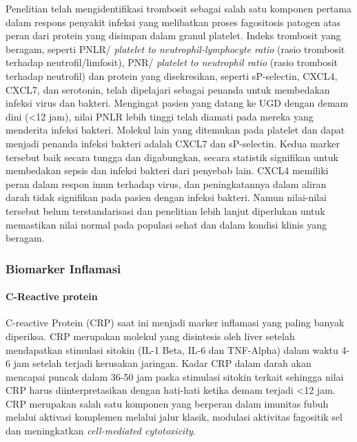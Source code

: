 \documentclass[
  10pt,
  letterpaper,
]{article}
\begin{document}
Penelitian telah mengidentifikasi trombosit sebagai salah satu komponen
pertama dalam respons penyakit infeksi yang melibatkan proses
fagositosis patogen atas peran dari protein yang disimpan dalam granul
platelet. Indeks trombosit yang beragam, seperti PNLR/ \emph{platelet to
neutrophil-lymphocyte ratio} (rasio trombosit terhadap
neutrofil/limfosit), PNR/ \emph{platelet to neutrophil ratio} (rasio
trombosit terhadap neutrofil) dan protein yang disekresikan, seperti
sP-selectin, CXCL4, CXCL7, dan serotonin, telah dipelajari sebagai
penanda untuk membedakan infeksi virus dan bakteri.\citep{semple2011}
Mengingat pasien yang datang ke UGD dengan demam dini (\textless12 jam),
nilai PNLR lebih tinggi telah diamati pada mereka yang menderita infeksi
bakteri.\citep{vassiliou2014a} Molekul lain yang ditemukan pada platelet
dan dapat menjadi penanda infeksi bakteri adalah CXCL7 dan sP-selectin.
Kedua marker tersebut baik secara tungga dan digabungkan, secara
statistik signifikan untuk membedakan sepsis dan infeksi bakteri dari
penyebab lain.\citep{zonneveld2014} CXCL4 memiliki peran dalam respon
imun terhadap virus, dan peningkatannya dalam aliran darah tidak
signifikan pada pasien dengan infeksi bakteri. Namun nilai-nilai
tersebut belum terstandarisasi dan penelitian lebih lanjut diperlukan
untuk memastikan nilai normal pada populasi sehat dan dalam kondisi
klinis yang beragam.\citep{heijnen2015}

\subsubsection{Biomarker Inflamasi}\label{biomarker-inflamasi}

\paragraph{C-Reactive protein}\label{c-reactive-protein}

C-reactive Protein (CRP) saat ini menjadi marker inflamasi yang paling
banyak diperiksa. CRP merupakan molekul yang disintesis oleh liver
setelah mendapatkan stimulasi sitokin (IL-1 Beta, IL-6 dan TNF-Alpha)
dalam waktu 4-6 jam setelah terjadi kerusakan jaringan. Kadar CRP dalam
darah akan mencapai puncak dalam 36-50 jam paska stimulasi sitokin
terkait sehingga nilai CRP harus diinterpretasikan dengan hati-hati
ketika demam terjadi \textless12 jam. CRP merupakan salah satu komponen
yang berperan dalam imunitas fubuh melalui aktivasi komplemen melalui
jalur klasik, modulasi aktivitas fagositik sel dan meningkatkan
\emph{cell-mediated cytotoxicity}.\citep{bernardi2024}
\end{document}
